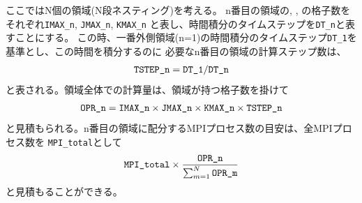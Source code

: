 ここではN個の領域(N段ネスティング)を考える。
n番目の領域の{\XDIR}, {\YDIR}, {\ZDIR}の格子数をそれぞれ\verb|IMAX_n|, \verb|JMAX_n|, \verb|KMAX_n|
と表し、時間積分のタイムステップを\verb|DT_n|と表すことにする。
この時、一番外側領域(n=1)の時間積分のタイムステップ\verb|DT_1|を基準とし、この時間を積分するのに
必要なn番目の領域の計算ステップ数は、
\begin{eqnarray}
 \verb|TSTEP_n| = \verb|DT_1| / \verb|DT_n|  \nonumber
\end{eqnarray}
と表される。領域全体での計算量は、領域が持つ格子数を掛けて
\begin{eqnarray}
 \verb|OPR_n| = \verb|IMAX_n| \times \verb|JMAX_n| \times \verb|KMAX_n| \times \verb|TSTEP_n| \nonumber
\end{eqnarray}
と見積もられる。n番目の領域に配分するMPIプロセス数の目安は、全MPIプロセス数を \verb|MPI_total|として
\begin{eqnarray}
 \verb|MPI_total| \times \frac{ \texttt{OPR\_n} }{ \sum_{m=1}^N \texttt{OPR\_m} }
\end{eqnarray}
と見積もることができる。



